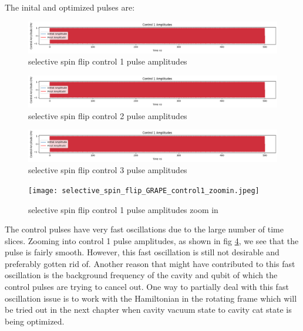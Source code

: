 \documentclass[12pt]{report}
\begin{document}
The inital and optimized pulses are: 
\begin{figure}[H]
    \centering
    \includegraphics[width=0.95\linewidth]{selective_spin_flip_GRAPE_control1.png}
    \caption{selective spin flip control 1 pulse amplitudes}
    \label{fig:selective_spin_flip_control1}
\end{figure}
\begin{figure}[H]
    \centering
    \includegraphics[width=0.95\linewidth]{selective_spin_flip_GRAPE_control1.png}
    \caption{selective spin flip control 2 pulse amplitudes}
    \label{fig:selective_spin_flip_control2}
\end{figure}
\begin{figure}[H]
    \centering
    \includegraphics[width=0.95\linewidth]{selective_spin_flip_GRAPE_control1.png}
    \caption{selective spin flip control 3 pulse amplitudes}
    \label{fig:selective_spin_flip_control3}
\end{figure}
\begin{figure}[H]
    \centering
    \texttt{[image: selective\_spin\_flip\_GRAPE\_control1\_zoomin.jpeg]}
    \caption{selective spin flip control 1 pulse amplitudes zoom in}
    \label{fig:selective_spin_flip_GRAPE_control1_zoomin}
\end{figure}

The control pulses have very fast oscillations due to the large number of time slices.
Zooming into control 1 pulse amplitudes, as shown in fig \ref{fig:selective_spin_flip_GRAPE_control1_zoomin},
we see that the pulse is fairly smooth. However, this fast oscillation is still not desirable and preferably gotten rid of. 
Another reason that might have contributed to this fast oscillation is the background frequency of the cavity and qubit 
of which the control pulses are trying to cancel out. One way to partially deal with this fast oscillation issue is to work
with the Hamiltonian in the rotating frame which will be tried out in the next chapter when cavity vacuum state to cavity cat state
is being optimized.  
\end{document}
